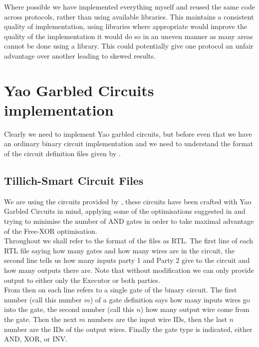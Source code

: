 \documentclass[ %
                    author={Nicholas Tutte},
                supervisor={Prof. Nigel Smart},
                    degree={MEng},
                     title={Secure Two Party Computation},
                  subtitle={A practical comparison of recent protocols},
                      type={Research - GG1K},
                      year={2015} ]{dissertation}
\begin{document}
\begin{appendices}
				Where possible we have implemented everything myself and reused the same code across protocols, rather than using available libraries. This maintains a consistent quality of implementation, using libraries where appropriate would improve the quality of the implementation it would do so in an uneven manner as many areas cannot be done using a library. This could potentially give one protocol an unfair advantage over another leading to skewed results.

			\section{Yao Garbled Circuits implementation}

				Clearly we need to implement Yao garbled circuits, but before even that we have an ordinary binary circuit implementation and we need to understand the format of the circuit definition files given by \cite{NigelCircuits}.

				\subsection{Tillich-Smart Circuit Files}

					We are using the circuits provided by \cite{NigelCircuits}, these circuits have been crafted with Yao Garbled Circuits in mind, applying some of the optimisations suggested in \cite{SMC_Is_Practical} and trying to minimise the number of AND gates in order to take maximal advantage of the Free-XOR optimisation.\\

					Throughout we shall refer to the format of the files as RTL. The first line of each RTL file saying how many gates and how many wires are in the circuit, the second line tells us how many inputs party 1 and Party 2 give to the circuit and how many outputs there are. Note that without modification we can only provide output to either only the Executor or both parties.\\

					From then on each line refers to a single gate of the binary circuit. The first number (call this number $m$) of a gate definition says how many inputs wires go into the gate, the second number (call this $n$) how many output wire come from the gate. Then the next $m$ numbers are the input wire IDs, then the last $n$ number are the IDs of the output wires. Finally the gate type is indicated, either AND, XOR, or INV.\\


\end{appendices}
\end{document}
